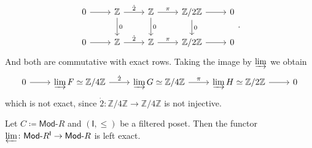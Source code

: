 \begin{rem}
\begin{equation}
	\end{equation} 
	\begin{equation}
	\begin{tikzcd}
		0 \arrow[r, "", rightarrow] &
		\Z \arrow[r, "\dot{2}", rightarrow] \arrow[d, "0", rightarrow] &
		\Z \arrow[r, "\pi", rightarrow] \arrow[d, "0", rightarrow] &
		\mathbb{Z}/2\mathbb{Z} \arrow[r, "", rightarrow] \arrow[d, "0", rightarrow] &
		0 \\
		0 \arrow[r, "", rightarrow] &
		\Z \arrow[r, "\dot{2}", rightarrow]&
		\Z \arrow[r, "\pi", rightarrow] &
		\mathbb{Z}/2\mathbb{Z} \arrow[r, "", rightarrow] &
		0
	\end{tikzcd}
	.\end{equation}
	And both are commutative with exact rows.
	Taking the image by $\varinjlim$ we obtain
	\begin{equation}
	\begin{tikzcd}
		0 \arrow[r, "", rightarrow] &
		\varinjlim F \simeq \mathbb{Z}/4\mathbb{Z} \arrow[r, "\dot{2}", rightarrow] &
		\varinjlim G \simeq \mathbb{Z}/4\mathbb{Z} \arrow[r, "\pi", rightarrow] &
		\varinjlim H \simeq \mathbb{Z}/2\mathbb{Z} \arrow[r, "", rightarrow] &
		0
	\end{tikzcd}
	\end{equation} 
	which is not exact, since $\dot{2}\colon \mathbb{Z}/4\mathbb{Z} \to \mathbb{Z}/4\mathbb{Z}$ is not injective.
\end{rem}

\begin{prop}
	Let $C \coloneqq \mathsf{Mod}\text{-}R$ and $\left(\mathsf{I}, \leq\right)$ be a filtered poset.
	Then the functor $\varprojlim\colon \mathsf{Mod}\text{-}R^{\mathsf{I}} \to \mathsf{Mod}\text{-}R$ is left exact.
\end{prop} 

